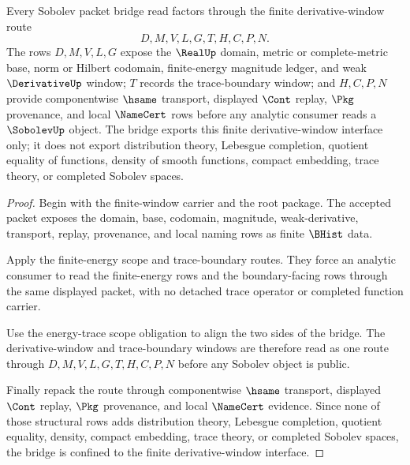 \begin{theorem}
\label{thm:sobolev-bridged-finite-derivative-window}
Every Sobolev packet bridge read factors through the finite derivative-window route
$$
D,M,V,L,G,T,H,C,P,N .
$$
The rows $D,M,V,L,G$ expose the $\RealUp$ domain, metric or complete-metric base, norm or Hilbert codomain, finite-energy magnitude ledger, and weak $\DerivativeUp$ window; $T$ records the trace-boundary window; and $H,C,P,N$ provide componentwise $\hsame$ transport, displayed $\Cont$ replay, $\Pkg$ provenance, and local $\NameCert$ rows before any analytic consumer reads a $\SobolevUp$ object. The bridge exports this finite derivative-window interface only; it does not export distribution theory, Lebesgue completion, quotient equality of functions, density of smooth functions, compact embedding, trace theory, or completed Sobolev spaces.
\end{theorem}
\begin{proof}
Begin with the finite-window carrier and the root package. The accepted packet exposes the domain, base, codomain, magnitude, weak-derivative, transport, replay, provenance, and local naming rows as finite $\BHist$ data.

Apply the finite-energy scope and trace-boundary routes. They force an analytic consumer to read the finite-energy rows and the boundary-facing rows through the same displayed packet, with no detached trace operator or completed function carrier.

Use the energy-trace scope obligation to align the two sides of the bridge. The derivative-window and trace-boundary windows are therefore read as one route through $D,M,V,L,G,T,H,C,P,N$ before any Sobolev object is public.

Finally repack the route through componentwise $\hsame$ transport, displayed $\Cont$ replay, $\Pkg$ provenance, and local $\NameCert$ evidence. Since none of those structural rows adds distribution theory, Lebesgue completion, quotient equality, density, compact embedding, trace theory, or completed Sobolev spaces, the bridge is confined to the finite derivative-window interface.
\end{proof}
